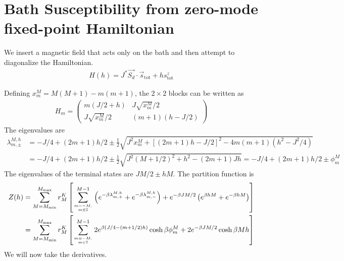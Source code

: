 \documentclass{revtex4-2}
\numberwithin{equation}{section}
\begin{document}
\section{Bath Susceptibility from zero-mode fixed-point Hamiltonian}
We insert a magnetic field that acts only on the bath and then attempt to diagonalize the Hamiltonian.
\begin{equation}\begin{aligned}
	H(h) = J^* \vec{S_d}\cdot\vec{s}_\text{tot} + h s^z_\text{tot}
\end{aligned}\end{equation}

Defining \(x^M_m = M(M+1) - m(m+1)\), the \(2\times 2\) blocks can be written as
\begin{equation}\begin{aligned}
	H_m = \begin{pmatrix} m(J/2 + h) & J\sqrt{x^M_m}/2 \\ J\sqrt{x^M_m}/2 & (m+1)(h - J/2) \end{pmatrix} 
\end{aligned}\end{equation}
The eigenvalues are 
\begin{equation}\begin{aligned}
	\lambda_{m, \pm}^{M, h} &= -J/4 + (2m+1)h/2 \pm \frac{1}{2}\sqrt{J^2x^M_m + \left[(2m+1)h - J/2\right]^2 - 4m(m+1)(h^2 - J^2/4)} \\
				&= -J/4 + (2m+1)h/2 \pm \frac{1}{2}\sqrt{J^2(M + 1/2)^2 + h^2 - (2m+1)Jh}	= -J/4 + (2m+1)h/2 \pm \phi^M_m
\end{aligned}\end{equation}
The eigenvalues of the terminal states are \(JM/2 \pm hM\). The partition function is
\begin{equation}\begin{aligned}
	Z(h) &= \sum_{M=M_\text{min}}^{M_\text{max}}r^K_M\left[\sum_{m=-M, \atop{m\in \mathbb{Z}}}^{M-1}\left(e^{-\beta \lambda_{m, +}^{M, h}} + e^{-\beta \lambda_{m, -}^{M, h}}\right) + e^{-\beta JM/2}\left(e^{\beta hM} + e^{-\beta hM}\right)\right] \\
	     &=\sum_{M=M_\text{min}}^{M_\text{max}}r^K_M\left[\sum_{m=-M, \atop{m\in \mathbb{Z}}}^{M-1}2e^{\beta \left(J/4 - (m+1/2)h\right)}\cosh \beta\phi^M_m + 2e^{-\beta JM/2}\cosh \beta Mh\right]
\end{aligned}\end{equation}
We will now take the derivatives.
\end{document}

